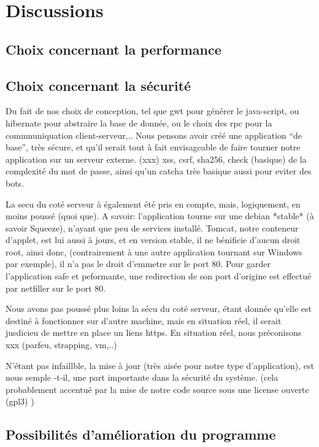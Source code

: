 \section{Discussions}
\subsection{Choix concernant la performance}
\subsection{Choix concernant la sécurité}

Du fait de nos choix de conception, tel que gwt pour générer le java-script, ou
hibernate pour abstraire la base de donnée, ou le choix des rpc pour la
commnuniquation client-serveur,..  Nous pensons avoir créé une application ``de
base'', très sécure, et qu'il serait tout à fait envisageable de faire tourner notre
application sur un serveur externe.
(xxx) xss, csrf, sha256, check (basique) de la complexité du mot de passe, ainsi
qu'un catcha très basique aussi pour eviter des bots.

La secu du coté serveur à également été pris en compte, mais, logiquement, en
moins poussé (quoi que).  A savoir: l'application tourne sur une debian *stable*
(à savoir Squeeze), n'ayant que peu de services installé.
Tomcat, notre conteneur d'applet, est lui aussi à jours, et en version stable,
il ne bénificie d'aucun droit root, ainsi donc, (contrairement à une autre
application tournant sur Windows par exemple), il n'a pas le droit d'emmetre sur
le port 80. Pour garder l'application safe et peformante, une redirection de
son port d'origine est effectué par netfiller sur le port 80.

Nous avons pas poussé plus loins la sécu du coté serveur, étant donnée qu'elle
est destiné à fonctionner sur d'autre machine, mais en situation réel, il serait
jusdicieu de mettre en place un liens https.  En situation réel, nous
préconisons xxx (parfeu, strapping, vm,..)

N'étant pas infaillble, la mise à jour (très aisée pour notre type
d'application), est nous semple -t-il, une part importante dans la sécurité du
système. (cela probablement accentué par la mise de notre code source sous une
license ouverte (gpl3) )
\subsection{Possibilités d'amélioration du programme}

